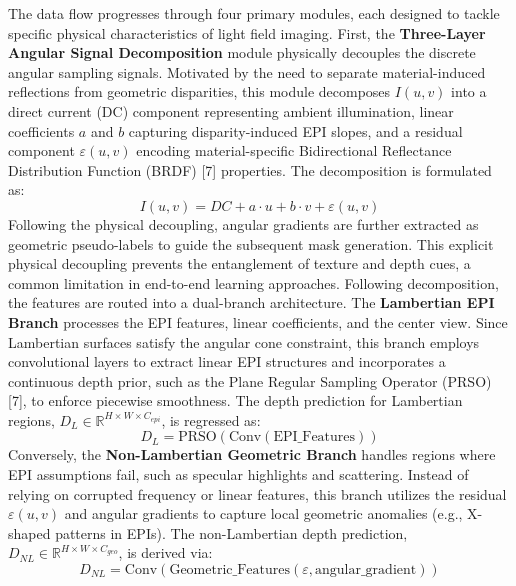 The data flow progresses through four primary modules, each designed to tackle specific physical characteristics of light field imaging. First, the \textbf{Three-Layer Angular Signal Decomposition} module physically decouples the discrete angular sampling signals. Motivated by the need to separate material-induced reflections from geometric disparities, this module decomposes $I(u,v)$ into a direct current (DC) component representing ambient illumination, linear coefficients $a$ and $b$ capturing disparity-induced EPI slopes, and a residual component $\varepsilon(u,v)$ encoding material-specific Bidirectional Reflectance Distribution Function (BRDF) [7] properties. The decomposition is formulated as:
\begin{equation}
\label{eq:eq1}
I(u,v) = DC + a \cdot u + b \cdot v + \varepsilon(u,v)
\end{equation}
Following the physical decoupling, angular gradients are further extracted as geometric pseudo-labels to guide the subsequent mask generation. This explicit physical decoupling prevents the entanglement of texture and depth cues, a common limitation in end-to-end learning approaches. Following decomposition, the features are routed into a dual-branch architecture. The \textbf{Lambertian EPI Branch} processes the EPI features, linear coefficients, and the center view. Since Lambertian surfaces satisfy the angular cone constraint, this branch employs convolutional layers to extract linear EPI structures and incorporates a continuous depth prior, such as the Plane Regular Sampling Operator (PRSO) [7], to enforce piecewise smoothness. The depth prediction for Lambertian regions, $D_L \in \mathbb{R}^{H \times W \times C_{epi}}$, is regressed as:
\begin{equation}
\label{eq:eq2}
D_L = \text{PRSO}(\text{Conv}(\text{EPI\_Features}))
\end{equation}
Conversely, the \textbf{Non-Lambertian Geometric Branch} handles regions where EPI assumptions fail, such as specular highlights and scattering. Instead of relying on corrupted frequency or linear features, this branch utilizes the residual $\varepsilon(u,v)$ and angular gradients to capture local geometric anomalies (e.g., X-shaped patterns in EPIs). The non-Lambertian depth prediction, $D_{NL} \in \mathbb{R}^{H \times W \times C_{geo}}$, is derived via:
\begin{equation}
\label{eq:eq3}
D_{NL} = \text{Conv}(\text{Geometric\_Features}(\varepsilon, \text{angular\_gradient}))
\end{equation}
